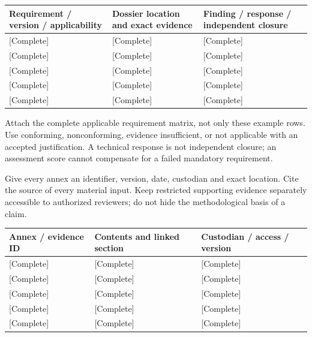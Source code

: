 {\sffamily\fontsize{8.3}{10.3}\selectfont\begin{longtable}{@{}P{51.14mm} P{57.74mm} P{56.09mm}@{}}
\toprule
\textbf{Requirement / version / applicability} & \textbf{Dossier location and exact evidence} & \textbf{Finding / response / independent closure}\\\midrule\endhead
\rule{0pt}{7.7mm}[Complete] & [Complete] & [Complete]\\\hline
\rule{0pt}{7.7mm}[Complete] & [Complete] & [Complete]\\\hline
\rule{0pt}{7.7mm}[Complete] & [Complete] & [Complete]\\\hline
\rule{0pt}{7.7mm}[Complete] & [Complete] & [Complete]\\\hline
\rule{0pt}{7.7mm}[Complete] & [Complete] & [Complete]\\\hline
\end{longtable}}
\begin{Notice}Attach the complete applicable requirement matrix, not only these example rows. Use conforming, nonconforming, evidence insufficient, or not applicable with an accepted justification. A technical response is not independent closure; an assessment score cannot compensate for a failed mandatory requirement.\end{Notice}
\begin{Notice}Give every annex an identifier, version, date, custodian and exact location. Cite the source of every material input. Keep restricted supporting evidence separately accessible to authorized reviewers; do not hide the methodological basis of a claim.\end{Notice}
{\sffamily\fontsize{8.3}{10.3}\selectfont\begin{longtable}{@{}P{39.59mm} P{75.89mm} P{49.49mm}@{}}
\toprule
\textbf{Annex / evidence ID} & \textbf{Contents and linked section} & \textbf{Custodian / access / version}\\\midrule\endhead
\rule{0pt}{7.7mm}[Complete] & [Complete] & [Complete]\\\hline
\rule{0pt}{7.7mm}[Complete] & [Complete] & [Complete]\\\hline
\rule{0pt}{7.7mm}[Complete] & [Complete] & [Complete]\\\hline
\rule{0pt}{7.7mm}[Complete] & [Complete] & [Complete]\\\hline
\rule{0pt}{7.7mm}[Complete] & [Complete] & [Complete]\\\hline
\end{longtable}}
